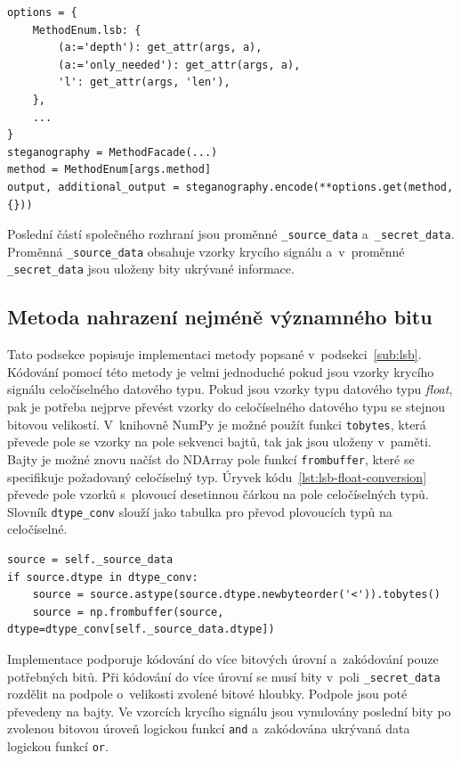 \begin{lstlisting}[language=PythonPlus, label={lst:general-method-usage},
caption={Zobecněné použití fasády a~steganografických metod.}]
options = {
    MethodEnum.lsb: {
        (a:='depth'): get_attr(args, a),
        (a:='only_needed'): get_attr(args, a),
        'l': get_attr(args, 'len'),
    },
    ...
}
steganography = MethodFacade(...)
method = MethodEnum[args.method]
output, additional_output = steganography.encode(**options.get(method, {}))
\end{lstlisting}

Poslední částí společného rozhraní jsou proměnné \texttt{\_source\_data}
a~\texttt{\_secret\_data}. Proměnná \texttt{\_source\_data} obsahuje vzorky
krycího signálu a~v~proměnné \texttt{\_secret\_data} jsou uloženy bity ukrývané
informace.

\subsection*{Metoda nahrazení nejméně významného bitu}
\label{sub:lsb-implementation}

Tato podsekce popisuje implementaci metody popsané v~podsekci~\ref{sub:lsb}.
Kódování pomocí této metody je velmi jednoduché pokud jsou vzorky krycího
signálu celočíselného datového typu. Pokud jsou vzorky typu datového typu
\textit{float}, pak je potřeba nejprve převést vzorky do celočíselného datového
typu se stejnou bitovou velikostí. V~knihovně NumPy je možné použít funkci
\texttt{tobytes}, která převede pole se vzorky na pole sekvenci bajtů, tak jak
jsou uloženy v~paměti. Bajty je možné znovu načíst do NDArray pole funkcí
\texttt{frombuffer}, které se specifikuje požadovaný celočíselný typ. Úryvek
kódu~\ref{lst:lsb-float-conversion} převede pole vzorků s~plovoucí desetinnou
čárkou na pole celočíselných typů. Slovník \texttt{dtype\_conv} slouží jako
tabulka pro převod plovoucích typů na celočíselné.

\begin{lstlisting}[language=PythonPlus, label={lst:lsb-float-conversion},
caption={Převedení datového typu s~plovoucí desetinnou čárkou na celočíselný
datový typ.}]
source = self._source_data
if source.dtype in dtype_conv:
    source = source.astype(source.dtype.newbyteorder('<')).tobytes()
    source = np.frombuffer(source, dtype=dtype_conv[self._source_data.dtype])
\end{lstlisting}

Implementace podporuje kódování do více bitových úrovní a~zakódování pouze
potřebných bitů. Při kódování do více úrovní se musí bity v~poli
\texttt{\_secret\_data} rozdělit na podpole o~velikosti zvolené bitové hloubky.
Podpole jsou poté převedeny na bajty. Ve vzorcích krycího signálu jsou
vynulovány poslední bity po zvolenou bitovou úroveň logickou funkcí
\texttt{and} a~zakódována ukrývaná data logickou funkcí \texttt{or}.

